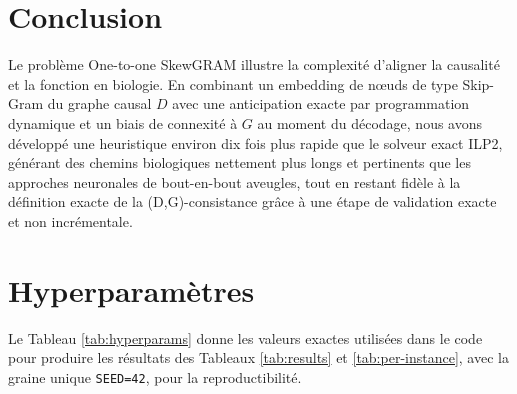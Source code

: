 \documentclass{llncs}
\begin{document}
\section{Conclusion}
Le problème One-to-one SkewGRAM illustre la complexité d'aligner la causalité et la fonction en biologie. En combinant un embedding de nœuds de type Skip-Gram du graphe causal $D$ avec une anticipation exacte par programmation dynamique et un biais de connexité à $G$ au moment du décodage, nous avons développé une heuristique environ dix fois plus rapide que le solveur exact ILP2, générant des chemins biologiques nettement plus longs et pertinents que les approches neuronales de bout-en-bout aveugles, tout en restant fidèle à la définition exacte de la (D,G)-consistance grâce à une étape de validation exacte et non incrémentale.

\appendix
\section{Hyperparamètres}
\label{sec:hyperparams}

Le Tableau \ref{tab:hyperparams} donne les valeurs exactes utilisées dans le code pour produire les résultats des Tableaux \ref{tab:results} et \ref{tab:per-instance}, avec la graine unique \texttt{SEED=42}, pour la reproductibilité.
\end{document}
